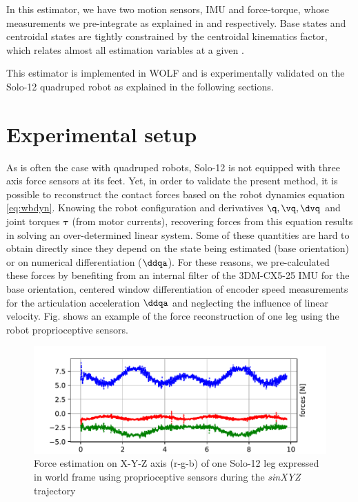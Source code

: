 In this estimator, we have two motion sensors, IMU and force-torque, whose measurements we pre-integrate as explained in  and
 respectively. Base states and centroidal states are tightly constrained by the centroidal kinematics factor, which relates almost all 
estimation variables at a given \keyframes.

This estimator is implemented in WOLF \cite{sola2021wolf} and is experimentally validated on the Solo-12 quadruped robot as explained in the following sections. 

\section{Experimental setup}
%  
As is often the case with quadruped robots, Solo-12 is not equipped with three axis force sensors at its feet. 
Yet, in order to validate the present method, it is possible to reconstruct the contact forces based on the robot dynamics 
equation \eqref{eq:wbdyn}. Knowing the robot configuration and derivatives $\q,\vq,\dvq$ and joint torques $\bm\tau$ (from motor currents), 
recovering forces from this equation results in solving an over-determined linear system. Some of these quantities are hard to obtain directly 
since they depend on the state being estimated (\eg base orientation) or on numerical differentiation ($\ddqa$). For these reasons, we pre-calculated 
these forces by benefiting from an internal filter of the 3DM-CX5-25 IMU for the base orientation, centered window differentiation of encoder speed 
measurements for the articulation acceleration $\ddqa$ and neglecting the influence of linear velocity. Fig.  shows an example of 
the force reconstruction of one leg using the robot proprioceptive sensors.
%
\begin{figure}
    \centering
    \includegraphics[width=0.9\columnwidth]{figures/centroidal/forces_solo_1leg.pdf}
    \caption{Force estimation on X-Y-Z axis (r-g-b) of one Solo-12 leg expressed in world frame using proprioceptive sensors during the \textit{sinXYZ} trajectory}
    \label{fig:force_est}
\end{figure}


